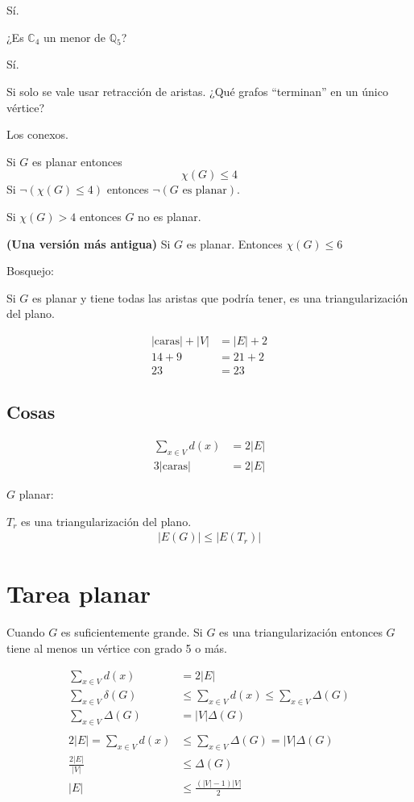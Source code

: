 \documentclass[../main.tex]{subfiles}
\begin{document}
Sí.

¿Es $\mathbb{C}_4$ un menor de $\mathbb{Q}_5$?

Sí.

Si solo se vale usar retracción de aristas.
¿Qué grafos ``terminan'' en un único vértice?

Los conexos.

Si $G$ es planar entonces
\[
	\chi(G) \leq 4
\]
Si $\neg(\chi(G) \leq 4)$ entonces $\neg(G \text{ es planar})$.

Si $\chi(G)>4$ entonces $G$ no es planar.

\textbf{(Una versión más antigua)}
Si $G$ es planar.
Entonces $\chi(G)\leq 6$

Bosquejo:

Si $G$ es planar y tiene todas las aristas que podría tener, es una
triangularización del plano.

\begin{figure}[H]
	\boldmath
	\centering
	
\end{figure}

\teorema
\begin{align*}
	|\text{caras}| + |V| &= |E| + 2\\
	14 + 9 &= 21 +2\\
	23 &= 23
\end{align*}

\subsection*{Cosas}%
\begin{align*}
	\sum_{x\in V} d(x) &= 2|E|\\
	3|\text{caras}| &= 2|E|
\end{align*}

$G$ planar:

$T_r$ es una triangularización del plano.
\begin{align*}
	|E(G)| \leq |E(T_r)|
\end{align*}

\section{Tarea planar}%
\label{sec:tarea_planar}

Cuando $G$ es suficientemente grande.
Si $G$ es una triangularización entonces $G$ tiene al menos un vértice con
grado 5 o más.

\begin{align*}
	\sum_{x\in V}d(x) &= 2|E|\\
	\sum_{x\in V}\delta(G) &\leq \sum_{x\in V}d(x) \leq\sum_{x\in V}\Delta(G)\\
	\sum_{x\in V}\Delta(G) &= |V|\Delta(G)\\
	\\
	2|E|=\sum_{x\in V} d(x) &\leq \sum_{x\in V}\Delta(G) = |V|\Delta(G)\\
	\frac{2|E|}{|V|} &\leq  \Delta(G)\\
	|E| &\leq \frac{(|V|-1)|V|}{2}
\end{align*}

\begin{figure}[H]
	\boldmath
	\centering
	
\end{figure}
\end{document}
